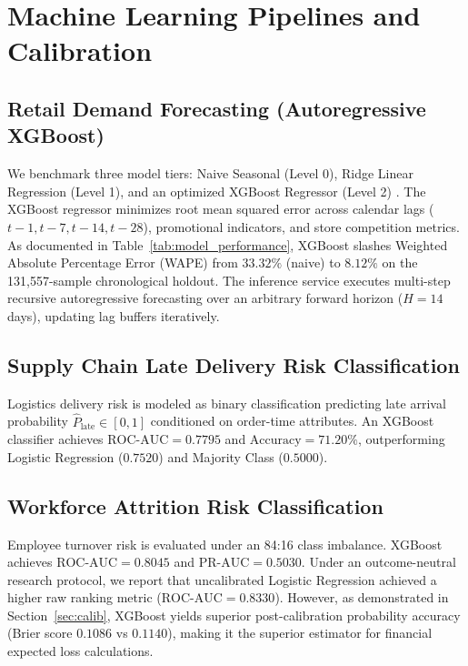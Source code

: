 \documentclass[conference]{IEEEtran}
\begin{document}
\section{Machine Learning Pipelines and Calibration}

\subsection{Retail Demand Forecasting (Autoregressive XGBoost)}
We benchmark three model tiers: Naive Seasonal (Level 0), Ridge Linear Regression (Level 1), and an optimized XGBoost Regressor (Level 2) \cite{chen2016xgboost}. The XGBoost regressor minimizes root mean squared error across calendar lags ($t-1, t-7, t-14, t-28$), promotional indicators, and store competition metrics. As documented in Table~\ref{tab:model_performance}, XGBoost slashes Weighted Absolute Percentage Error (WAPE) from $33.32\%$ (naive) to $8.12\%$ on the 131,557-sample chronological holdout. The inference service executes multi-step recursive autoregressive forecasting over an arbitrary forward horizon ($H=14$ days), updating lag buffers iteratively.

\subsection{Supply Chain Late Delivery Risk Classification}
Logistics delivery risk is modeled as binary classification predicting late arrival probability $\hat{P}_{\text{late}} \in [0, 1]$ conditioned on order-time attributes. An XGBoost classifier achieves $\text{ROC-AUC} = 0.7795$ and $\text{Accuracy} = 71.20\%$, outperforming Logistic Regression ($0.7520$) and Majority Class ($0.5000$).

\subsection{Workforce Attrition Risk Classification}
Employee turnover risk is evaluated under an 84:16 class imbalance. XGBoost achieves $\text{ROC-AUC} = 0.8045$ and $\text{PR-AUC} = 0.5030$. Under an outcome-neutral research protocol, we report that uncalibrated Logistic Regression achieved a higher raw ranking metric ($\text{ROC-AUC} = 0.8330$). However, as demonstrated in Section~\ref{sec:calib}, XGBoost yields superior post-calibration probability accuracy (Brier score $0.1086$ vs $0.1140$), making it the superior estimator for financial expected loss calculations.
\end{document}

